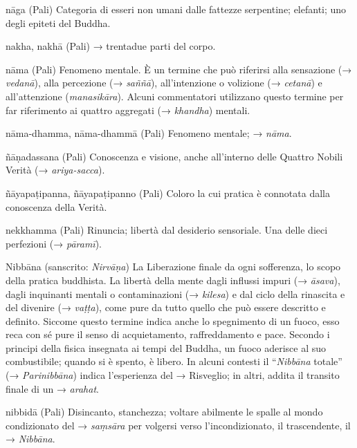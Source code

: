 \begin{glossarydescription}

\item[nāga] (Pali) Categoria di esseri non umani dalle fattezze serpentine;
elefanti; uno degli epiteti del Buddha.

\item[nakha, nakhā] (Pali) → trentadue parti del corpo.

\item[nāma] (Pali) Fenomeno mentale. È un termine che può riferirsi alla
sensazione (→ \emph{vedanā}), alla percezione (→ \emph{saññā}),
all'intenzione o volizione (→ \emph{cetanā}) e all'attenzione
(\emph{manasikāra}). Alcuni commentatori utilizzano questo termine per
far riferimento ai quattro aggregati (→ \emph{khandha}) mentali.

\item[nāma-dhamma, nāma-dhammā] (Pali) Fenomeno mentale; →
\emph{nāma}.

\item[ñāṇadassana] (Pali) Conoscenza e visione, anche all'interno delle
Quattro Nobili Verità (→ \emph{ariya-sacca}).

\item[ñāyapaṭipanna, ñāyapaṭipanno] (Pali) Coloro la cui pratica è
connotata dalla conoscenza della Verità.

\item[nekkhamma] (Pali) Rinuncia; libertà dal desiderio sensoriale. Una delle
dieci perfezioni (→ \emph{pāramī}).

\item[Nibbāna] (sanscrito: \emph{Nirvāṇa}) La Liberazione finale da ogni
sofferenza, lo scopo della pratica buddhista. La libertà della mente
dagli influssi impuri (→ \emph{āsava}), dagli inquinanti mentali o
contaminazioni (→ \emph{kilesa}) e dal ciclo della rinascita e del
divenire (→ \emph{vaṭṭa}), come pure da tutto quello che può essere
descritto e definito. Siccome questo termine indica anche lo spegnimento
di un fuoco, esso reca con sé pure il senso di acquietamento,
raffreddamento e pace. Secondo i principi della fisica insegnata ai
tempi del Buddha, un fuoco aderisce al suo combustibile; quando si è
spento, è libero. In alcuni contesti il ``\emph{Nibbāna} totale'' (→
\emph{Parinibbāna}) indica l'esperienza del → Risveglio; in altri,
addita il transito finale di un → \emph{arahat}.

\item[nibbidā] (Pali) Disincanto, stanchezza; voltare abilmente le spalle al
mondo condizionato del → \emph{saṃsāra} per volgersi verso
l'incondizionato, il trascendente, il → \emph{Nibbāna}.


\end{glossarydescription}
